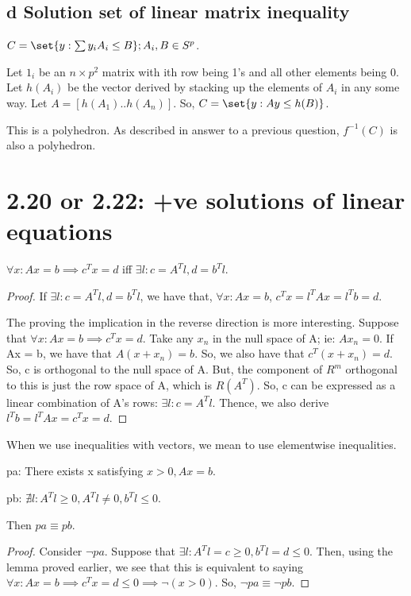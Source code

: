 \documentclass{article}
\begin{document}
\subsection{d Solution set of linear matrix inequality}
$C = \set{y: \sum y_i A_i \leq B}; A_i, B \in S^{p}$.

Let $1_i$ be an $n \times p^{2}$ matrix with ith row being 1's and all other elements being 0. Let $h(A_i)$ be the vector derived by stacking up the elements of $A_i$ in any some way. Let $A = [h(A_1)  .. h(A_n)]$. So, $C = \set{y: Ay \leq h(B)}$.

This is a polyhedron. As described in answer to a previous question, $f^{-1}(C)$ is also a polyhedron.

\section{2.20 or 2.22: +ve solutions of linear equations}
\begin{lem}
$\forall x: Ax = b \implies c^{T}x = d$ iff $\exists l: c = A^{T}l, d = b^{T}l$.
\end{lem}
\begin{proof}
If $\exists l: c = A^{T}l, d = b^{T}l$, we have that, $\forall x: Ax = b$, $ c^{T}x = l^{T}Ax = l^{T}b = d$.

The proving the implication in the reverse direction is more interesting. Suppose that $\forall x: Ax = b \implies c^{T}x = d$. Take any $x_n$ in the null space of A; ie: $Ax_n = 0$. If Ax = b, we have that $A(x + x_n) = b$. So, we also have that $c^{T}(x + x_n) = d$. So, c is orthogonal to the null space of A. But, the component of $R^{m}$ orthogonal to this is just the row space of A, which is $R(A^{T})$. So, c can be expressed as a linear combination of A's rows: $\exists l: c = A^{T}l$. Thence, we also derive $l^{T}b = l^{T}Ax = c^{T}x = d$.
\end{proof}

\begin{notation}
When we use inequalities with vectors, we mean to use elementwise inequalities.
\end{notation}


\begin{thm}
pa: There exists x satisfying $x > 0, Ax = b$.

pb: $\nexists l: A^{T}l \geq 0, A^{T}l \neq 0, b^{T}l \leq 0$.

Then $pa \equiv pb$.
\end{thm}
\begin{proof}
Consider $\lnot pa$. Suppose that $\exists l: A^{T}l = c \geq 0, b^{T}l = d \leq 0$. Then, using the lemma proved earlier, we see that this is equivalent to saying $\forall x: Ax = b \implies c^{T}x = d \leq 0 \implies \lnot( x > 0)$. So, $\lnot pa \equiv \lnot pb$.
\end{proof}
\end{document}
